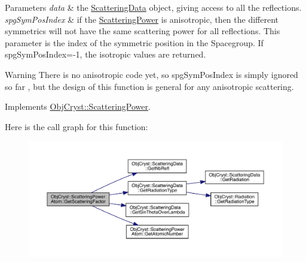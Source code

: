 \begin{DoxyParams}{Parameters}
{\em data} & the \mbox{\hyperlink{class_obj_cryst_1_1_scattering_data}{Scattering\+Data}} object, giving access to all the reflections. \\
\hline
{\em spg\+Sym\+Pos\+Index} & if the \mbox{\hyperlink{class_obj_cryst_1_1_scattering_power}{Scattering\+Power}} is anisotropic, then the different symmetrics will not have the same scattering power for all reflections. This parameter is the index of the symmetric position in the Spacegroup. If spg\+Sym\+Pos\+Index=-\/1, the isotropic values are returned. \\
\hline
\end{DoxyParams}
\begin{DoxyWarning}{Warning}
There is no anisotropic code yet, so spg\+Sym\+Pos\+Index is simply ignored so far , but the design of this function is general for any anisotropic scattering. 
\end{DoxyWarning}


Implements \mbox{\hyperlink{class_obj_cryst_1_1_scattering_power_af18f3eaaf45af87bc3a2a0ff21bc34b6}{Obj\+Cryst\+::\+Scattering\+Power}}.

Here is the call graph for this function\+:
\nopagebreak
\begin{figure}[H]
\begin{center}
\leavevmode
\includegraphics[width=350pt]{class_obj_cryst_1_1_scattering_power_atom_a2ae5ca3726d70f371acfbafc97d300ab_cgraph}
\end{center}
\end{figure}
\mbox{\label{class_obj_cryst_1_1_scattering_power_atom_adc30331f57e8d79f362b4f2bccb9d4dd}} 
